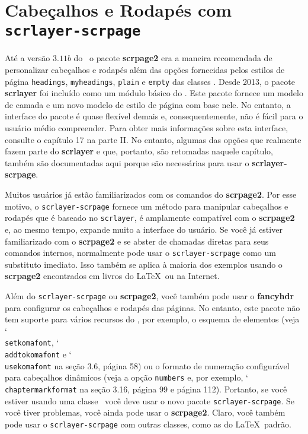 \chapter{Cabeçalhos e Rodapés com \texttt{scrlayer-scrpage}}
\label{chap20}

Até a versão $3.11b$ do \KOMAScript\ o pacote \textbf{scrpage2} era a maneira recomendada de personalizar cabeçalhos e rodapés além das opções fornecidas pelos estilos de página \texttt{headings}, \texttt{myheadings}, \texttt{plain} e \texttt{empty} das classes \KOMAScript. Desde 2013, o pacote \textbf{scrlayer} foi incluído como um módulo básico do \KOMAScript. Este pacote fornece um modelo de camada e um novo modelo de estilo de página com base nele. No entanto, a interface do pacote é quase flexível demais e, consequentemente, não é fácil para o usuário médio compreender. Para obter mais informações sobre esta interface, consulte o capítulo 17 na parte II. No entanto, algumas das opções que realmente fazem parte do \textbf{scrlayer} e que, portanto, são retomadas naquele capítulo, também são documentadas aqui porque são necessárias para usar o \textbf{scrlayer-scrpage}.

Muitos usuários já estão familiarizados com os comandos do \textbf{scrpage2}. Por esse motivo, o \texttt{scrlayer-scrpage} fornece um método para manipular cabeçalhos e rodapés que é baseado no \texttt{scrlayer}, é amplamente compatível com o \textbf{scrpage2} e, ao mesmo tempo, expande muito a interface do usuário. Se você já estiver familiarizado com o \textbf{scrpage2} e se abster de chamadas diretas para seus comandos internos, normalmente pode usar o \texttt{scrlayer-scrpage} como um substituto imediato. Isso também se aplica à maioria dos exemplos usando o \textbf{scrpage2} encontrados em livros do \LaTeX\ ou na Internet.

Além do \texttt{scrlayer-scrpage} ou \textbf{scrpage2}, você também pode usar o \textbf{fancyhdr} para configurar os cabeçalhos e rodapés das páginas. No entanto, este pacote não tem suporte para vários recursos do \KOMAScript, por exemplo, o esquema de elementos (veja \char`\\\texttt{set\-ko\-ma\-font}, \char`\\\texttt{add\-to\-ko\-ma\-font} e \char`\\\texttt{use\-ko\-ma\-font} na seção 3.6, página 58) ou o formato de numeração configurável para cabeçalhos dinâmicos (veja a opção \texttt{numbers} e, por exemplo, \char`\\\texttt{chap\-ter\-mark\-for\-mat} na seção 3.16, página 99 e página 112). Portanto, se você estiver usando uma classe \KOMAScript\ você deve usar o novo pacote \texttt{scrlayer-scrpage}. Se você tiver problemas, você ainda pode usar o \textbf{scrpage2}. Claro, você também pode usar o \texttt{scrlayer-scrpage} com outras classes, como as do \LaTeX\ padrão.

